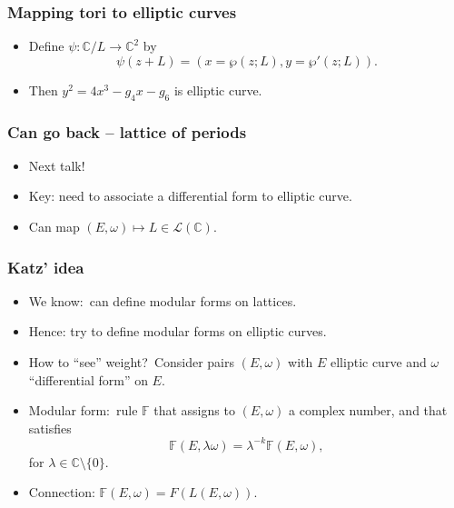 \documentclass[usenames,dvipsnames]{beamer}
\theoremstyle{definition}
\begin{document}
\begin{frame}
  \frametitle{Mapping tori to elliptic curves}
  \begin{itemize}
    \item Define $\psi:\mathbb{C}/L\to\mathbb{C}^2$ by\pause
      \[\psi(z+L)=(x=\wp(z;L),y=\wp'(z;L)).\]\pause
    \item Then $y^2=4x^3-g_4x-g_6$ is elliptic curve.
  \end{itemize}
\end{frame}

\begin{frame}
  \frametitle{Can go back -- lattice of periods}
  \begin{itemize}
    \item Next talk!\pause
    \item Key: need to associate a differential form to elliptic curve.\pause
    \item Can map $(E,\omega)\mapsto L\in\mathcal{L}(\mathbb{C})$.
  \end{itemize}
\end{frame}

\begin{frame}
  \frametitle{Katz' idea}
  \begin{itemize}
    \item We know:\pause~can define modular forms on lattices.\pause
    \item Hence: try to define modular forms on elliptic curves.\pause
    \item How to ``see'' weight?\pause~Consider pairs $(E,\omega)$ with $E$ elliptic curve and $\omega$ ``differential form'' on $E$.\pause
    \item Modular form:\pause~rule $\mathbb{F}$ that assigns to $(E,\omega)$ a complex number, and that satisfies\pause
      \[\mathbb{F}(E,\lambda\omega)=\lambda^{-k}\mathbb{F}(E,\omega),\]\pause
      for $\lambda\in\mathbb{C}\setminus\{0\}$.\pause
    \item Connection: $\mathbb{F}(E,\omega)=F(L(E,\omega))$.
  \end{itemize}
\end{frame}
\end{document}
